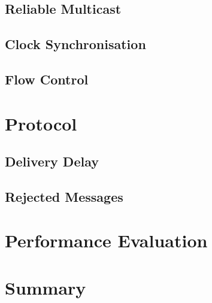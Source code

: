 	\subsection{Reliable Multicast}
	\subsection{Clock Synchronisation}
	\subsection{Flow Control}
	
\section{Protocol}
	\subsection{Delivery Delay}
	\subsection{Rejected Messages}
	
\section{Performance Evaluation}
	
\section{Summary}